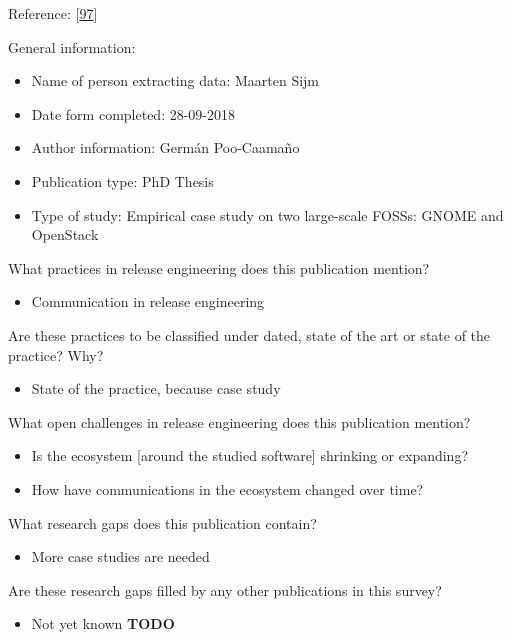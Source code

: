 \documentclass[]{book}
\providecommand{\tightlist}{%
  \setlength{\itemsep}{0pt}\setlength{\parskip}{0pt}}
\begin{document}
Reference: {[}\protect\hyperlink{ref-poo-caamano2016a}{97}{]}

General information:

\begin{itemize}
\tightlist
\item
  Name of person extracting data: Maarten Sijm
\item
  Date form completed: 28-09-2018
\item
  Author information: Germán Poo-Caamaño
\item
  Publication type: PhD Thesis
\item
  Type of study: Empirical case study on two large-scale FOSSs: GNOME
  and OpenStack
\end{itemize}

What practices in release engineering does this publication mention?

\begin{itemize}
\tightlist
\item
  Communication in release engineering
\end{itemize}

Are these practices to be classified under dated, state of the art or
state of the practice? Why?

\begin{itemize}
\tightlist
\item
  State of the practice, because case study
\end{itemize}

What open challenges in release engineering does this publication
mention?

\begin{itemize}
\tightlist
\item
  Is the ecosystem {[}around the studied software{]} shrinking or
  expanding?
\item
  How have communications in the ecosystem changed over time?
\end{itemize}

What research gaps does this publication contain?

\begin{itemize}
\tightlist
\item
  More case studies are needed
\end{itemize}

Are these research gaps filled by any other publications in this survey?

\begin{itemize}
\tightlist
\item
  Not yet known \textbf{TODO}
\end{itemize}
\end{document}
